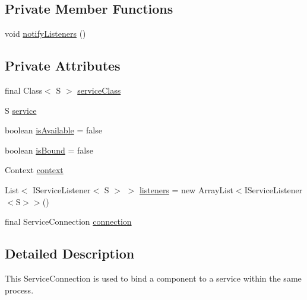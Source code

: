 \subsection*{Private Member Functions}
\begin{DoxyCompactItemize}
\item 
void \hyperlink{classcom_1_1qualoutdoor_1_1recorder_1_1LocalServiceConnection_3_01S_01extends_01Service_01_4_aae893747c6d559605c69a4a4ddaf0f24}{notify\-Listeners} ()
\end{DoxyCompactItemize}
\subsection*{Private Attributes}
\begin{DoxyCompactItemize}
\item 
final Class$<$ S $>$ \hyperlink{classcom_1_1qualoutdoor_1_1recorder_1_1LocalServiceConnection_3_01S_01extends_01Service_01_4_ad5a12d0cd17c4b6335e1a79958132b14}{service\-Class}
\item 
S \hyperlink{classcom_1_1qualoutdoor_1_1recorder_1_1LocalServiceConnection_3_01S_01extends_01Service_01_4_a499f27a81f1d6ca28fe96efd7a390694}{service}
\item 
boolean \hyperlink{classcom_1_1qualoutdoor_1_1recorder_1_1LocalServiceConnection_3_01S_01extends_01Service_01_4_add998e9cac132822c3c72265d85aacc8}{is\-Available} = false
\item 
boolean \hyperlink{classcom_1_1qualoutdoor_1_1recorder_1_1LocalServiceConnection_3_01S_01extends_01Service_01_4_adf9f940effc914553eeb998f16c1cb91}{is\-Bound} = false
\item 
Context \hyperlink{classcom_1_1qualoutdoor_1_1recorder_1_1LocalServiceConnection_3_01S_01extends_01Service_01_4_a04ac41815a3e3e0bf43f73a207326685}{context}
\item 
List$<$ I\-Service\-Listener$<$ S $>$ $>$ \hyperlink{classcom_1_1qualoutdoor_1_1recorder_1_1LocalServiceConnection_3_01S_01extends_01Service_01_4_ac1fcabe717a95d21e5aa9ec6165222fa}{listeners} = new Array\-List$<$I\-Service\-Listener$<$S$>$$>$()
\item 
final Service\-Connection \hyperlink{classcom_1_1qualoutdoor_1_1recorder_1_1LocalServiceConnection_3_01S_01extends_01Service_01_4_ae4d85a721382a87cb0df327e7fae8722}{connection}
\end{DoxyCompactItemize}


\subsection{Detailed Description}
This Service\-Connection is used to bind a component to a service within the same process.

